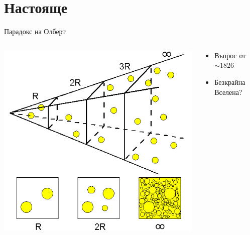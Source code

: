 \documentclass[10pt,a4paper]{beamer}
\begin{document}
    \section{ Настояще }

        \begin{frame}{}
            \tableofcontents[currentsection]
        \end{frame}
        
        \begin{frame}{ Парадокс на Олберт }
            \begin{columns}
                \begin{column}{0.5\textwidth}
                    \includegraphics[width=\textwidth]{images/olbers_paradox.png}
                \end{column}
                \begin{column}{0.5\textwidth}
                    \begin{itemize}
                        \item Въпрос от $ \sim 1826 $
                        \item Безкрайна Вселена?
                    \end{itemize}
                \end{column}
            \end{columns}
        \end{frame}
        
\end{document}
